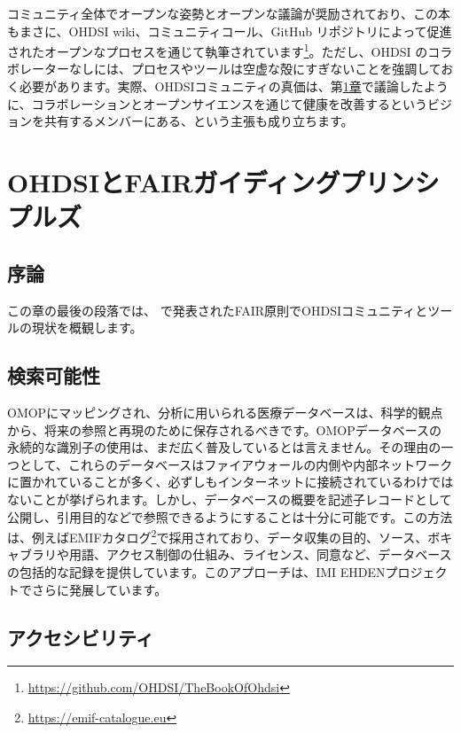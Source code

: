 \documentclass[
  11pt]{book}
\theoremstyle{definition}
\theoremstyle{definition}
\theoremstyle{definition}
\theoremstyle{definition}
\theoremstyle{remark}
\begin{document}
コミュニティ全体でオープンな姿勢とオープンな議論が奨励されており、この本もまさに、OHDSI wiki、コミュニティコール、GitHub リポジトリによって促進されたオープンなプロセスを通じて執筆されています\footnote{\url{https://github.com/OHDSI/TheBookOfOhdsi}}。ただし、OHDSI のコラボレーターなしには、プロセスやツールは空虚な殻にすぎないことを強調しておく必要があります。実際、OHDSIコミュニティの真価は、第\href{https://ohdsi.github.io/TheBookOfOhdsi/OhdsiCommunity.html\#OhdsiCommunity}{1章}で議論したように、コラボレーションとオープンサイエンスを通じて健康を改善するというビジョンを共有するメンバーにある、という主張も成り立ちます。

\section{OHDSIとFAIRガイディングプリンシプルズ}\label{ohdsiux3068fairux30acux30a4ux30c7ux30a3ux30f3ux30b0ux30d7ux30eaux30f3ux30b7ux30d7ux30ebux30ba}


\subsection{序論}\label{ux5e8fux8ad6}

この章の最後の段落では、\citet{wilkinson2016} で発表されたFAIR原則でOHDSIコミュニティとツールの現状を概観します。

\subsection{検索可能性}\label{ux691cux7d22ux53efux80fdux6027}

OMOPにマッピングされ、分析に用いられる医療データベースは、科学的観点から、将来の参照と再現のために保存されるべきです。OMOPデータベースの永続的な識別子の使用は、まだ広く普及しているとは言えません。その理由の一つとして、これらのデータベースはファイアウォールの内側や内部ネットワークに置かれていることが多く、必ずしもインターネットに接続されているわけではないことが挙げられます。しかし、データベースの概要を記述子レコードとして公開し、引用目的などで参照できるようにすることは十分に可能です。この方法は、例えばEMIFカタログ\footnote{\url{https://emif-catalogue.eu}}で採用されており、データ収集の目的、ソース、ボキャブラリや用語、アクセス制御の仕組み、ライセンス、同意など、データベースの包括的な記録を提供しています\citep{Oliveira2019}。このアプローチは、IMI EHDENプロジェクトでさらに発展しています。

\subsection{アクセシビリティ}\label{ux30a2ux30afux30bbux30b7ux30d3ux30eaux30c6ux30a3}
\end{document}
